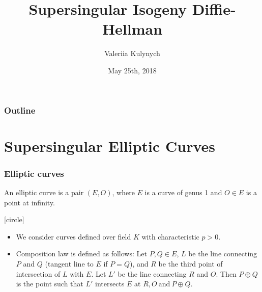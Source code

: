 \documentclass{beamer}
\title{Supersingular Isogeny Diffie-Hellman}
\author{Valeriia Kulynych}
\institute{Université de Toulon}
\date{May 25th, 2018}
\begin{document}
\begin{frame}
	\titlepage
\end{frame}

\begin{frame}
	\frametitle{Outline}
	\tableofcontents
\end{frame}

\section{Supersingular Elliptic Curves}

\begin{frame}
\frametitle{Elliptic curves}
	\begin{definition}
		An \alert{elliptic curve} is a pair $(E, O)$, where $E$ is a curve of genus 1 and $O \in E$ is a point at infinity.
	\end{definition}
	[circle]
	\begin{itemize}
		\item We consider curves defined over field $K$ with characteristic $p > 0$.
	
		 \item Composition law is defined as follows:
		Let $P, Q \in E$, $L$ be the line connecting $P$ and $Q$ (tangent line to $E$ if $P = Q$), and $R$ be the third point of intersection of $L$ with $E$. Let $L'$ be the line connecting $R$ and $O$. Then $P \oplus Q$ is the point such that $L'$ intersects $E$ at $R, O \ \text{and} \ P \oplus Q$.
	
	\end{itemize}
	

\end{frame}
\end{document}
